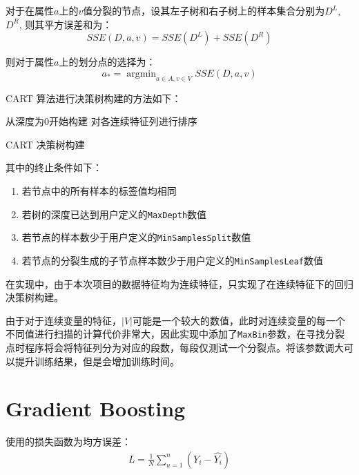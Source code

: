 \documentclass[12pt]{article}
\begin{document}
对于在属性$a$上的$v$值分裂的节点，设其左子树和右子树上的样本集合分别为$D^L$, $D^R$, 则其平方误差和为：
\begin{equation}
    SSE(D, a, v)=SSE(D^L) + SSE(D^R)
\end{equation}

则对于属性$a$上的划分点的选择为：
\begin{equation}
    a_*=\mathop{\arg\min}_{a\in A, v \in V}SSE(D,a,v)
\end{equation}

CART 算法进行决策树构建的方法如下：

\begin{algorithm}[H]
    \SetAlgoLined
    从深度为0开始构建\;
    对各连续特征列进行排序\;

    \caption{CART 决策树构建}
\end{algorithm}

其中的终止条件如下：
\begin{enumerate}
    \item 若节点中的所有样本的标签值均相同
    \item 若树的深度已达到用户定义的\lstinline{MaxDepth}数值
    \item 若节点的样本数少于用户定义的\lstinline{MinSamplesSplit}数值
    \item 若节点的分裂生成的子节点样本数少于用户定义的\lstinline{MinSamplesLeaf}数值
\end{enumerate}

在实现中，由于本次项目的数据特征均为连续特征，只实现了在连续特征下的回归决策树构建。

由于对于连续变量的特征，$|V|$可能是一个较大的数值，此时对连续变量的每一个不同值进行扫描的计算代价非常大，因此实现中添加了\lstinline{MaxBin}参数，在寻找分裂点时程序将会将特征列分为对应的段数，每段仅测试一个分裂点。将该参数调大可以提升训练结果，但是会增加训练时间。

\section{Gradient Boosting}

使用的损失函数为均方误差：
\begin{equation}
    \begin{aligned}
    L= \frac{1}{N}\sum_{u=1}^{n}(Y_i - \hat{Y_i})\\
    \end{aligned}
\end{equation}
\end{document}

